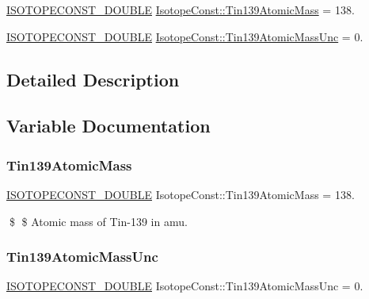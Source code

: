 \begin{DoxyCompactItemize}
\item 
\mbox{\hyperlink{group___isotope_const-_macros_ga8f45a7272ce02c0b4c65c44636ed719a}{I\+S\+O\+T\+O\+P\+E\+C\+O\+N\+S\+T\+\_\+\+D\+O\+U\+B\+LE}} \mbox{\hyperlink{group___isotope_const-_tin-_sn139_ga7b65b0abec8e3272a65ee9827af9b104}{Isotope\+Const\+::\+Tin139\+Atomic\+Mass}} = 138.
\item 
\mbox{\hyperlink{group___isotope_const-_macros_ga8f45a7272ce02c0b4c65c44636ed719a}{I\+S\+O\+T\+O\+P\+E\+C\+O\+N\+S\+T\+\_\+\+D\+O\+U\+B\+LE}} \mbox{\hyperlink{group___isotope_const-_tin-_sn139_ga50e89801c03e4d9496f7327c71219e51}{Isotope\+Const\+::\+Tin139\+Atomic\+Mass\+Unc}} = 0.
\end{DoxyCompactItemize}


\subsection{Detailed Description}


\subsection{Variable Documentation}
\mbox{\label{group___isotope_const-_tin-_sn139_ga7b65b0abec8e3272a65ee9827af9b104}} 
\subsubsection{\texorpdfstring{Tin139\+Atomic\+Mass}{Tin139AtomicMass}}
{\footnotesize\ttfamily \mbox{\hyperlink{group___isotope_const-_macros_ga8f45a7272ce02c0b4c65c44636ed719a}{I\+S\+O\+T\+O\+P\+E\+C\+O\+N\+S\+T\+\_\+\+D\+O\+U\+B\+LE}} Isotope\+Const\+::\+Tin139\+Atomic\+Mass = 138.}

\$ \$ Atomic mass of Tin-\/139 in amu. \mbox{\label{group___isotope_const-_tin-_sn139_ga50e89801c03e4d9496f7327c71219e51}} 
\subsubsection{\texorpdfstring{Tin139\+Atomic\+Mass\+Unc}{Tin139AtomicMassUnc}}
{\footnotesize\ttfamily \mbox{\hyperlink{group___isotope_const-_macros_ga8f45a7272ce02c0b4c65c44636ed719a}{I\+S\+O\+T\+O\+P\+E\+C\+O\+N\+S\+T\+\_\+\+D\+O\+U\+B\+LE}} Isotope\+Const\+::\+Tin139\+Atomic\+Mass\+Unc = 0.}

